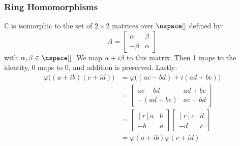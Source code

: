 \documentclass{article}                                                        %
\begin{document}
            \subsubsection{Ring Homomorphisms}
                \begin{example}
                    $\mathbb{C}$ is isomorphic to the set of $2\times{2}$
                    matrices over $\nspace[]$ defined by:
                    \begin{equation}
                        A=
                        \begin{bmatrix}
                            \alpha&\beta\\
                            \minus\beta&\alpha
                        \end{bmatrix}
                    \end{equation}
                    with $\alpha,\beta\in\nspace[]$. We map
                    $\alpha+i\beta$ to this matrix. Then 1 maps to the identity,
                    0 maps to 0, and addition is preserved. Lastly:
                    \begin{subequations}
                        \begin{align}
                            \varphi\big((a+ib)(c+id)\big)
                            &=\varphi\big((ac-bd)+i(ad+bc)\big)\\
                            &=
                            \begin{bmatrix}
                                ac-bd&ad+bc\\
                                \minus(ad+bc)&ac-bd
                            \end{bmatrix}\\
                            &=
                            \begin{bmatrix*}[r]
                                a&b\\
                                \minus{b}&a
                            \end{bmatrix*}
                            \begin{bmatrix*}[r]
                                c&d\\
                                \minus{d}&c
                            \end{bmatrix*}\\
                            &=\varphi(a+ib)\varphi(c+id)
                        \end{align}
                    \end{subequations}
                \end{example}
\end{document}
